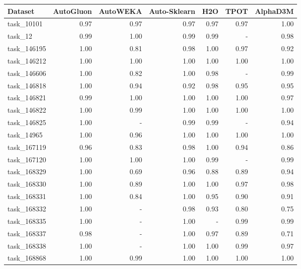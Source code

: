 \begin{tabular}{lrrrrrr}
\toprule
     Dataset &  AutoGluon &  AutoWEKA &  Auto-Sklearn &  H2O &  TPOT &  AlphaD3M \\
\midrule
  task\_10101 &       0.97 &      0.97 &          0.97 & 0.97 &  0.97 &      1.00 \\
     task\_12 &       0.99 &      1.00 &          0.99 & 0.99 &     - &      0.98 \\
 task\_146195 &       1.00 &      0.81 &          0.98 & 1.00 &  0.97 &      0.92 \\
 task\_146212 &       1.00 &      1.00 &          1.00 & 1.00 &  1.00 &      1.00 \\
 task\_146606 &       1.00 &      0.82 &          1.00 & 0.98 &     - &      0.99 \\
 task\_146818 &       1.00 &      0.94 &          0.92 & 0.98 &  0.95 &      0.95 \\
 task\_146821 &       0.99 &      1.00 &          1.00 & 1.00 &  1.00 &      0.97 \\
 task\_146822 &       1.00 &      0.99 &          1.00 & 1.00 &  1.00 &      1.00 \\
 task\_146825 &       1.00 &         - &          0.99 & 0.99 &     - &      0.94 \\
  task\_14965 &       1.00 &      0.96 &          1.00 & 1.00 &  1.00 &      1.00 \\
 task\_167119 &       0.96 &      0.83 &          0.98 & 1.00 &  0.94 &      0.86 \\
 task\_167120 &       1.00 &      1.00 &          1.00 & 0.99 &     - &      0.99 \\
 task\_168329 &       1.00 &      0.69 &          0.96 & 0.88 &  0.89 &      0.94 \\
 task\_168330 &       1.00 &      0.89 &          1.00 & 1.00 &  0.97 &      0.98 \\
 task\_168331 &       1.00 &      0.84 &          1.00 & 0.95 &  0.90 &      0.91 \\
 task\_168332 &       1.00 &         - &          0.98 & 0.93 &  0.80 &      0.75 \\
 task\_168335 &       1.00 &         - &          1.00 &    - &  0.99 &      0.99 \\
 task\_168337 &       0.98 &         - &          1.00 & 0.97 &  0.89 &      0.71 \\
 task\_168338 &       1.00 &         - &          1.00 & 1.00 &  0.99 &      0.97 \\
 task\_168868 &       1.00 &      0.99 &          1.00 & 1.00 &  1.00 &      1.00 \\

\end{tabular}
